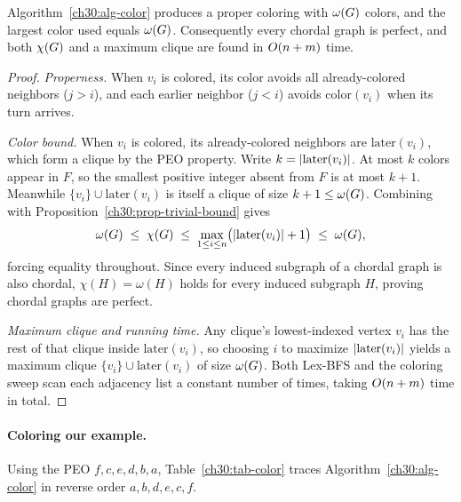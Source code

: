 \begin{theorem}\label{ch30:thm-greedy-opt}
Algorithm~\ref{ch30:alg-color} produces a proper coloring with $\omega(G)$ colors, and the largest color used equals $\omega(G)$. Consequently every chordal graph is perfect, and both $\chi(G)$ and a maximum clique are found in $O(n+m)$ time.
\end{theorem}

\begin{proof}
\emph{Properness.} When $v_i$ is colored, its color avoids all already-colored neighbors ($j>i$), and each earlier neighbor ($j<i$) avoids $\mathrm{color}(v_i)$ when its turn arrives.

\emph{Color bound.} When $v_i$ is colored, its already-colored neighbors are $\mathrm{later}(v_i)$, which form a clique by the PEO property. Write $k=\lvert\mathrm{later}(v_i)\rvert$. At most $k$ colors appear in $F$, so the smallest positive integer absent from $F$ is at most $k+1$. Meanwhile $\{v_i\}\cup\mathrm{later}(v_i)$ is itself a clique of size $k+1\le\omega(G)$. Combining with Proposition~\ref{ch30:prop-trivial-bound} gives
\[
  \omega(G) \;\le\; \chi(G) \;\le\; \max_{1\le i\le n}\bigl(\lvert\mathrm{later}(v_i)\rvert+1\bigr) \;\le\; \omega(G),
\]
forcing equality throughout. Since every induced subgraph of a chordal graph is also chordal, $\chi(H)=\omega(H)$ holds for every induced subgraph $H$, proving chordal graphs are perfect.

\emph{Maximum clique and running time.} Any clique's lowest-indexed vertex $v_i$ has the rest of that clique inside $\mathrm{later}(v_i)$, so choosing $i$ to maximize $\lvert\mathrm{later}(v_i)\rvert$ yields a maximum clique $\{v_i\}\cup\mathrm{later}(v_i)$ of size $\omega(G)$. Both Lex-BFS and the coloring sweep scan each adjacency list a constant number of times, taking $O(n+m)$ time in total.
\end{proof}

\paragraph{Coloring our example.}
Using the PEO $f,c,e,d,b,a$, Table~\ref{ch30:tab-color} traces Algorithm~\ref{ch30:alg-color} in reverse order $a,b,d,e,c,f$.

